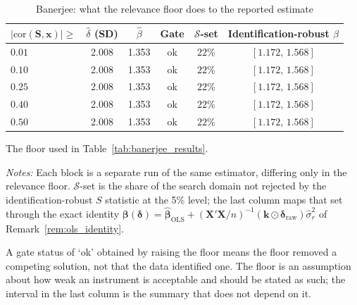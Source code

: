 \begin{table}[htbp]
\centering
\caption{Banerjee: what the relevance floor does to the reported estimate}
\label{tab:banerjee_sensitivity}
\begin{threeparttable}
\begin{tabular}{lccccc}
\toprule
$|\mathrm{cor}(\mathbf S,\mathbf x)|\ge$ & $\widehat\delta$ (SD) & $\widehat\beta$ & Gate & $\mathcal S$-set & Identification-robust $\beta$ \\
\midrule
$0.01$\tnote{a} & 2.008 & 1.353 & ok & $22$\% & $[1.172,\,1.568]$ \\
\addlinespace[2pt]
$0.10$ & 2.008 & 1.353 & ok & $22$\% & $[1.172,\,1.568]$ \\
\addlinespace[2pt]
$0.25$ & 2.008 & 1.353 & ok & $22$\% & $[1.172,\,1.568]$ \\
\addlinespace[2pt]
$0.40$ & 2.008 & 1.353 & ok & $22$\% & $[1.172,\,1.568]$ \\
\addlinespace[2pt]
$0.50$ & 2.008 & 1.353 & ok & $22$\% & $[1.172,\,1.568]$ \\
\bottomrule
\end{tabular}
\begin{tablenotes}
\small
\item[a] The floor used in Table~\ref{tab:banerjee_results}.
\item \textit{Notes:} Each block is a separate run of the same estimator,
differing only in the relevance floor. $\mathcal S$-set is the share of
the search domain not rejected by the identification-robust $S$ statistic
at the 5\% level; the last column maps that set through the exact identity
$\boldsymbol\beta(\boldsymbol\delta)=
\widehat{\boldsymbol\beta}_{\mathrm{OLS}}
+(\mathbf X'\mathbf X/n)^{-1}(\mathbf k\odot\boldsymbol\delta_{\mathrm{raw}})
\widehat\sigma_r^2$ of Remark~\ref{rem:ols_identity}.
\item A gate status of `ok' obtained by raising the floor means the floor
removed a competing solution, not that the data identified one. The floor
is an assumption about how weak an instrument is acceptable and should be
stated as such; the interval in the last column is the summary that does
not depend on it.
\end{tablenotes}
\end{threeparttable}
\end{table}
